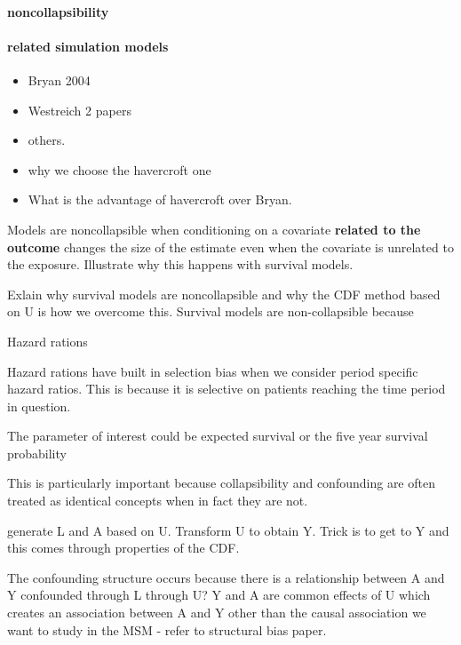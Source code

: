\documentclass[11pt]{article}
\providecommand{\tightlist}{%
      \setlength{\itemsep}{0pt}\setlength{\parskip}{0pt}}
\begin{document}
\paragraph{noncollapsibility}\label{noncollapsibility}

\paragraph{related simulation models}\label{related-simulation-models}

\begin{itemize}
\tightlist
\item
  Bryan 2004
\item
  Westreich 2 papers
\item
  others.
\item
  why we choose the havercroft one
\item
  What is the advantage of havercroft over Bryan.
\end{itemize}

Models are noncollapsible when conditioning on a covariate
\textbf{related to the outcome} changes the size of the estimate even
when the covariate is unrelated to the exposure. Illustrate why this
happens with survival models.

Exlain why survival models are noncollapsible and why the CDF method
based on U is how we overcome this. Survival models are non-collapsible
because

Hazard rations

Hazard rations have built in selection bias when we consider period
specific hazard ratios. This is because it is selective on patients
reaching the time period in question.

The parameter of interest could be expected survival or the five year
survival probability

This is particularly important because collapsibility and confounding
are often treated as identical concepts when in fact they are not.
\citet{Greenland1999}

generate L and A based on U. Transform U to obtain Y. Trick is to get to
Y and this comes through properties of the CDF.

The confounding structure occurs because there is a relationship between
A and Y confounded through L through U? Y and A are common effects of U
which creates an association between A and Y other than the causal
association we want to study in the MSM - refer to structural bias
paper.
\end{document}
